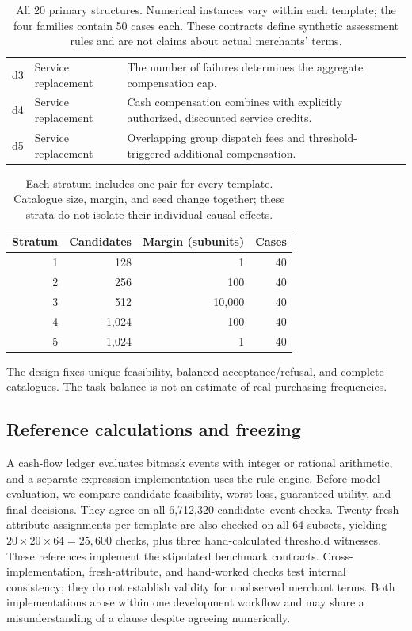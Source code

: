 \begin{table}[!tbp]
\begin{tabular}{llp{10.4cm}}
d3 & Service replacement & The number of failures determines the aggregate compensation cap.\\
d4 & Service replacement & Cash compensation combines with explicitly authorized, discounted service credits.\\
d5 & Service replacement & Overlapping group dispatch fees and threshold-triggered additional compensation.\\
\bottomrule
\end{tabular}
\caption{All 20 primary structures. Numerical instances vary within each template; the four families contain 50 cases each. These contracts define synthetic assessment rules and are not claims about actual merchants' terms.}
\label{tab:templates}
\end{table}

\begin{table}[!htbp]
\centering\small
\begin{tabular}{rrrr}
\toprule
Stratum & Candidates & Margin (subunits) & Cases\\
\midrule
1 & 128 & 1 & 40\\
2 & 256 & 100 & 40\\
3 & 512 & 10,000 & 40\\
4 & 1,024 & 100 & 40\\
5 & 1,024 & 1 & 40\\
\bottomrule
\end{tabular}
\caption{Each stratum includes one pair for every template. Catalogue size, margin, and seed change together; these strata do not isolate their individual causal effects.}
\label{tab:strata}
\end{table}

The design fixes unique feasibility, balanced acceptance/refusal, and complete catalogues. The task balance is not an estimate of real purchasing frequencies.

\subsection{Reference calculations and freezing}
A cash-flow ledger evaluates bitmask events with integer or rational arithmetic, and a separate expression implementation uses the rule engine. Before model evaluation, we compare candidate feasibility, worst loss, guaranteed utility, and final decisions. They agree on all 6,712,320 candidate--event checks. Twenty fresh attribute assignments per template are also checked on all 64 subsets, yielding $20\times20\times64=25{,}600$ checks, plus three hand-calculated threshold witnesses. These references implement the stipulated benchmark contracts. Cross-implementation, fresh-attribute, and hand-worked checks test internal consistency; they do not establish validity for unobserved merchant terms. Both implementations arose within one development workflow and may share a misunderstanding of a clause despite agreeing numerically.

